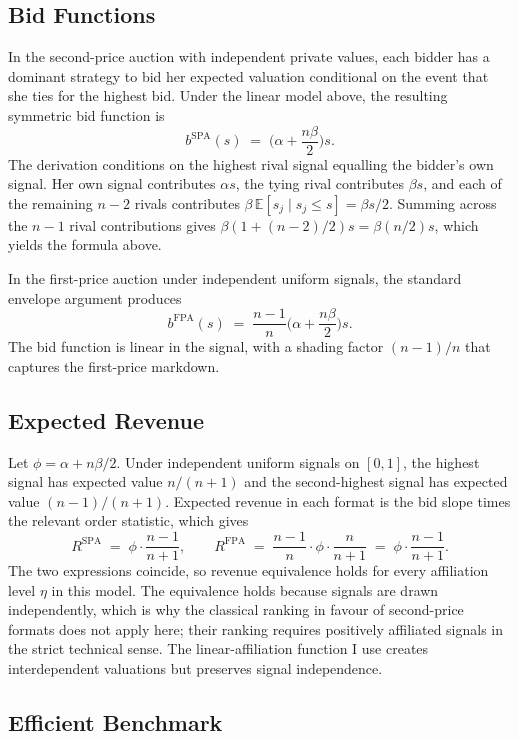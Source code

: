 \subsection{Bid Functions}

In the second-price auction with independent private values, each bidder has a dominant strategy to bid her expected valuation conditional on the event that she ties for the highest bid. Under the linear model above, the resulting symmetric bid function is
\[
b^{\mathrm{SPA}}(s) \;=\; \Big(\alpha + \frac{n \beta}{2}\Big) s.
\]
The derivation conditions on the highest rival signal equalling the bidder's own signal. Her own signal contributes $\alpha s$, the tying rival contributes $\beta s$, and each of the remaining $n - 2$ rivals contributes $\beta \, \mathbb{E}[s_j \mid s_j \leq s] = \beta s / 2$. Summing across the $n - 1$ rival contributions gives $\beta (1 + (n-2)/2) s = \beta (n/2) s$, which yields the formula above.

In the first-price auction under independent uniform signals, the standard envelope argument produces
\[
b^{\mathrm{FPA}}(s) \;=\; \frac{n - 1}{n} \Big(\alpha + \frac{n \beta}{2}\Big) s.
\]
The bid function is linear in the signal, with a shading factor $(n - 1)/n$ that captures the first-price markdown.

\subsection{Expected Revenue}

Let $\phi = \alpha + n \beta / 2$. Under independent uniform signals on $[0, 1]$, the highest signal has expected value $n / (n + 1)$ and the second-highest signal has expected value $(n - 1) / (n + 1)$. Expected revenue in each format is the bid slope times the relevant order statistic, which gives
\[
R^{\mathrm{SPA}} \;=\; \phi \cdot \frac{n - 1}{n + 1},
\qquad
R^{\mathrm{FPA}} \;=\; \frac{n - 1}{n} \cdot \phi \cdot \frac{n}{n + 1} \;=\; \phi \cdot \frac{n - 1}{n + 1}.
\]
The two expressions coincide, so revenue equivalence holds for every affiliation level $\eta$ in this model. The equivalence holds because signals are drawn independently, which is why the classical \citet{MilgromWeber1982} ranking in favour of second-price formats does not apply here; their ranking requires positively affiliated signals in the strict technical sense. The linear-affiliation function I use creates interdependent valuations but preserves signal independence.

\subsection{Efficient Benchmark}

